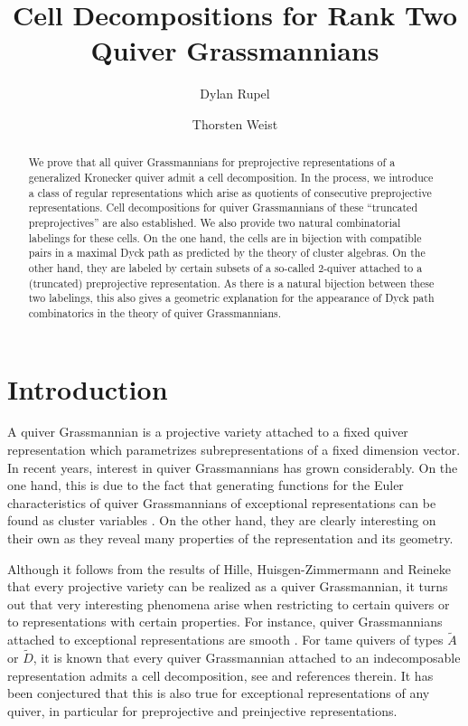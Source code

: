 \documentclass{amsart}
\title{Cell Decompositions for Rank Two Quiver Grassmannians}
\author{Dylan Rupel}
\author{Thorsten Weist}
\numberwithin{equation}{section}
\begin{document}
\begin{abstract}
  We prove that all quiver Grassmannians for preprojective representations of a generalized Kronecker quiver admit a cell decomposition.  
  In the process, we introduce a class of regular representations which arise as quotients of consecutive preprojective representations.
  Cell decompositions for quiver Grassmannians of these ``truncated preprojectives'' are also established. 
  We also provide two natural combinatorial labelings for these cells.
  On the one hand, the cells are in bijection with compatible pairs in a maximal Dyck path as predicted by the theory of cluster algebras.
  On the other hand, they are labeled by certain subsets of a so-called $2$-quiver attached to a (truncated) preprojective representation.
  As there is a natural bijection between these two labelings, this also gives a geometric explanation for the appearance of Dyck path combinatorics in the theory of quiver Grassmannians. 
\end{abstract}

\setcounter{tocdepth}{2}

\maketitle

\tableofcontents
\section{Introduction}
\noindent A quiver Grassmannian is a projective variety attached to a fixed quiver representation which parametrizes subrepresentations of a fixed dimension vector.
In recent years, interest in quiver Grassmannians has grown considerably.
On the one hand, this is due to the fact that generating functions for the Euler characteristics of quiver Grassmannians of exceptional representations can be found as cluster variables \cite{ck}.
On the other hand, they are clearly interesting on their own as they reveal many properties of the representation and its geometry.

Although it follows from the results of Hille, Huisgen-Zimmermann and Reineke that every projective variety can be realized as a quiver Grassmannian, 
it turns out that very interesting phenomena arise when restricting to certain quivers or to representations with certain properties.
For instance, quiver Grassmannians attached to exceptional representations are smooth \cite{cr}.
For tame quivers of types $\tilde A$ or $\tilde D$, it is known that every quiver Grassmannian attached to an indecomposable representation admits a cell decomposition, see \cite{ce,lw} and references therein.
It has been conjectured that this is also true for exceptional representations of any quiver, in particular for preprojective and preinjective representations. 
\end{document}
